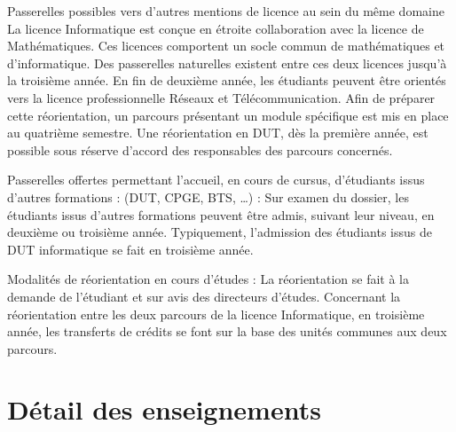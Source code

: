 \documentclass[10pt, a5paper]{report}
\begin{document}
\begin{spacing}{1.5}
Passerelles possibles vers d'autres mentions de licence au sein du même domaine
La licence Informatique est  conçue en étroite collaboration avec la licence de Mathématiques. Ces licences comportent un socle commun de mathématiques et d'informatique. Des passerelles naturelles existent entre ces deux licences jusqu'à la troisième année.
En fin de deuxième année, les étudiants peuvent être orientés vers la licence professionnelle Réseaux et Télécommunication. Afin de préparer cette réorientation, un parcours présentant un module spécifique est mis en place au quatrième semestre.
Une réorientation en DUT, dès la première année, est possible sous réserve d'accord des responsables des parcours concernés.

Passerelles offertes permettant l'accueil, en cours de cursus, d'étudiants issus d'autres formations : (DUT, CPGE, BTS, …) :
Sur examen du dossier, les étudiants issus d'autres formations peuvent être admis, suivant leur niveau, en deuxième ou troisième année. Typiquement, l'admission des étudiants issus de DUT informatique se fait en troisième année.

Modalités de réorientation en cours d'études :
La réorientation se fait à la demande de l'étudiant et sur avis des directeurs d'études. Concernant la réorientation entre les deux parcours de la licence Informatique, en troisième année, les transferts de crédits se font sur la base des unités communes aux deux parcours.

\section*{Détail des enseignements}

  \end{spacing}
\end{document}
